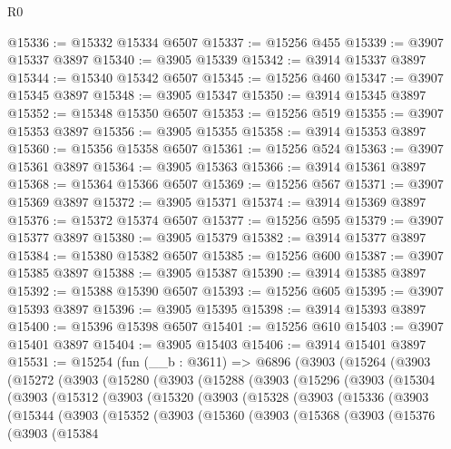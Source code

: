 \begin{lexlean}{R0}
\begin{coremodule}
@15336 := @15332 @15334 @6507
@15337 := @15256 @455
@15339 := @3907 @15337 @3897
@15340 := @3905 @15339
@15342 := @3914 @15337 @3897
@15344 := @15340 @15342 @6507
@15345 := @15256 @460
@15347 := @3907 @15345 @3897
@15348 := @3905 @15347
@15350 := @3914 @15345 @3897
@15352 := @15348 @15350 @6507
@15353 := @15256 @519
@15355 := @3907 @15353 @3897
@15356 := @3905 @15355
@15358 := @3914 @15353 @3897
@15360 := @15356 @15358 @6507
@15361 := @15256 @524
@15363 := @3907 @15361 @3897
@15364 := @3905 @15363
@15366 := @3914 @15361 @3897
@15368 := @15364 @15366 @6507
@15369 := @15256 @567
@15371 := @3907 @15369 @3897
@15372 := @3905 @15371
@15374 := @3914 @15369 @3897
@15376 := @15372 @15374 @6507
@15377 := @15256 @595
@15379 := @3907 @15377 @3897
@15380 := @3905 @15379
@15382 := @3914 @15377 @3897
@15384 := @15380 @15382 @6507
@15385 := @15256 @600
@15387 := @3907 @15385 @3897
@15388 := @3905 @15387
@15390 := @3914 @15385 @3897
@15392 := @15388 @15390 @6507
@15393 := @15256 @605
@15395 := @3907 @15393 @3897
@15396 := @3905 @15395
@15398 := @3914 @15393 @3897
@15400 := @15396 @15398 @6507
@15401 := @15256 @610
@15403 := @3907 @15401 @3897
@15404 := @3905 @15403
@15406 := @3914 @15401 @3897
@15531 := @15254
    (fun (__b : @3611) =>
    @6896
      (@3903
        (@15264
          (@3903
            (@15272
              (@3903
                (@15280
                  (@3903
                    (@15288
                      (@3903
                        (@15296
                          (@3903
                            (@15304
                              (@3903
                                (@15312
                                  (@3903
                                    (@15320
                                      (@3903
                                        (@15328
                                          (@3903
                                            (@15336
                                              (@3903
                                                (@15344
                                                  (@3903
                                                    (@15352
                                                      (@3903
                                                        (@15360
                                                          (@3903
                                                            (@15368
                                                              (@3903
                                                                (@15376
                                                                  (@3903
                                                                    (@15384

\end{coremodule}
\end{lexlean}
